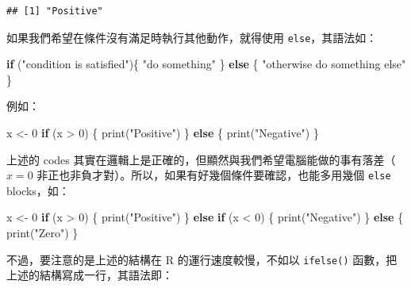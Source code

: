 \documentclass[
]{book}
\newenvironment{Shaded}{\begin{snugshade}}{\end{snugshade}}
\newcommand{\ControlFlowTok}[1]{\textcolor[rgb]{0.13,0.29,0.53}{\textbf{#1}}}
\newcommand{\DecValTok}[1]{\textcolor[rgb]{0.00,0.00,0.81}{#1}}
\newcommand{\FunctionTok}[1]{\textcolor[rgb]{0.00,0.00,0.00}{#1}}
\newcommand{\NormalTok}[1]{#1}
\newcommand{\OtherTok}[1]{\textcolor[rgb]{0.56,0.35,0.01}{#1}}
\newcommand{\SpecialCharTok}[1]{\textcolor[rgb]{0.00,0.00,0.00}{#1}}
\newcommand{\StringTok}[1]{\textcolor[rgb]{0.31,0.60,0.02}{#1}}
\theoremstyle{definition}
\theoremstyle{remark}
\begin{document}
\begin{verbatim}
## [1] "Positive"
\end{verbatim}

如果我們希望在條件沒有滿足時執行其他動作，就得使用 \texttt{else}，其語法如：

\begin{Shaded}
\begin{Highlighting}[]
\ControlFlowTok{if}\NormalTok{ (}\StringTok{"condition is satisfied"}\NormalTok{)\{ }
  \StringTok{"do something"}
\NormalTok{\} }\ControlFlowTok{else}\NormalTok{ \{}
  \StringTok{"otherwise do something else"}
\NormalTok{\}}
\end{Highlighting}
\end{Shaded}

例如：

\begin{Shaded}
\begin{Highlighting}[]
\NormalTok{x }\OtherTok{\textless{}{-}} \DecValTok{0}
\ControlFlowTok{if}\NormalTok{ (x }\SpecialCharTok{\textgreater{}} \DecValTok{0}\NormalTok{) \{}
  \FunctionTok{print}\NormalTok{(}\StringTok{"Positive"}\NormalTok{)}
\NormalTok{\} }\ControlFlowTok{else}\NormalTok{ \{}
  \FunctionTok{print}\NormalTok{(}\StringTok{"Negative"}\NormalTok{)}
\NormalTok{\}}
\end{Highlighting}
\end{Shaded}

上述的 codes 其實在邏輯上是正確的，但顯然與我們希望電腦能做的事有落差（\(x=0\) 非正也非負才對）。所以，如果有好幾個條件要確認，也能多用幾個 \texttt{else} blocks，如：

\begin{Shaded}
\begin{Highlighting}[]
\NormalTok{x }\OtherTok{\textless{}{-}} \DecValTok{0}
\ControlFlowTok{if}\NormalTok{ (x }\SpecialCharTok{\textgreater{}} \DecValTok{0}\NormalTok{) \{}
  \FunctionTok{print}\NormalTok{(}\StringTok{"Positive"}\NormalTok{)}
\NormalTok{\} }\ControlFlowTok{else} \ControlFlowTok{if}\NormalTok{ (x }\SpecialCharTok{\textless{}} \DecValTok{0}\NormalTok{) \{}
  \FunctionTok{print}\NormalTok{(}\StringTok{"Negative"}\NormalTok{)}
\NormalTok{\} }\ControlFlowTok{else}\NormalTok{ \{}
  \FunctionTok{print}\NormalTok{(}\StringTok{"Zero"}\NormalTok{)}
\NormalTok{\}}
\end{Highlighting}
\end{Shaded}

不過，要注意的是上述的結構在 R 的運行速度較慢，不如以 \texttt{ifelse()} 函數，把上述的結構寫成一行，其語法即：
\end{document}
